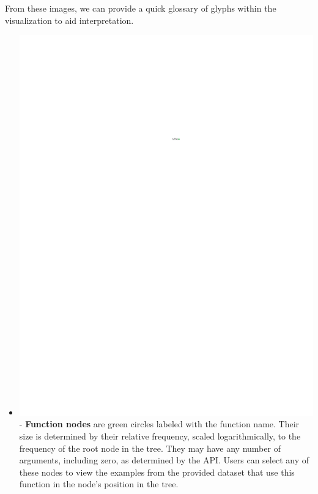 \documentclass[conference]{IEEEtran}
\begin{document}
	From these images, we can provide a quick glossary of glyphs within the
	visualization to aid interpretation. \begin{itemize} \item
		\includegraphics{glossary-green} - \textbf{Function nodes} are green circles
		labeled with the function name. Their size is determined by their relative
		frequency, scaled logarithmically, to the frequency of the root node in the
		tree. They may have any number of arguments, including zero, as determined by
		the API. Users can select any of these nodes to view the examples from the 
		provided dataset that use this function in the node's position in the tree.
		

\end{itemize}
\end{document}
